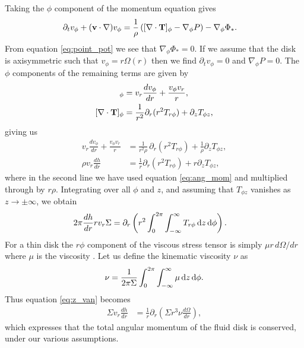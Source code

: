 Taking the $\phi$ component of the momentum equation gives
\begin{align}
    \partial_t v_\phi + (\mathbf{v} \cdot \nabla) v_\phi &= \frac{1}{\rho} \left( [\nabla \cdot \mathbf{T}]_\phi - \nabla_\phi P  \right) - \nabla_\phi \Phi_*.
\end{align}
From equation \ref{eq:point_pot} we see that $\nabla_\phi \Phi_* = 0$. If we assume that the disk is axisymmetric such that $v_\phi=r \Omega(r)$ then we find $\partial_t v_\phi = 0$ and $\nabla_\phi P=0$. 
The $\phi$ components of the remaining terms are given by \citep[eg.][]{armitage2022}
\begin{align}
    [(v \cdot \nabla) \VF{v}]_\phi &= v_r \frac{dv_\phi}{dr} + \frac{v_\phi v_r}{r}, \\
    [\nabla \cdot \VF{T}]_\phi &= \frac{1}{r^2} \partial_r (r^2 T_{r\phi}) + \partial_z T_{\phi z},
\end{align}
giving us
\begin{align}
    v_r \frac{dv_\phi}{dr} + \frac{v_\phi v_r}{r} &= \frac{1}{r^2 \rho} \, \partial_r (r^2 T_{r\phi}) + \frac{1}{\rho} \partial_z T_{\phi z}, \\
    \rho v_r \frac{dh}{dr} &= \frac{1}{r} \partial_r (r^2 T_{r\phi}) + r \partial_z T_{\phi z},
\end{align}
where in the second line we have used equation \ref{eq:ang_mom} and multiplied through by  $r \rho$. Integrating over all $\phi$ and $z$, and assuming that $T_{\phi z}$ vanishes as $z\rightarrow\pm\infty$, we obtain 
\begin{align}
    2\pi \frac{dh}{dr} r v_r \Sigma &= \partial_r \left( r^2 \int_0^{2\pi} \int_{-\infty}^\infty T_{r\phi} \mathop{}\!\mathrm{d}{z} \mathop{}\!\mathrm{d}{\phi} \right). \label{eq:z_van}
\end{align}
For a thin disk the $r\phi$ component of the viscous stress tensor is simply $\mu r \, d\Omega/dr$ where $\mu$ is the viscosity \citep[see review by][]{papaloizou1995}. 
Let us define the kinematic viscosity $\nu$ as 
\begin{align}
    \nu = \frac{1}{2 \pi \Sigma} \int_0^{2\pi} \int_{-\infty}^\infty \mu \mathop{}\!\mathrm{d}{z} \mathop{}\!\mathrm{d}{\phi}.
\end{align}
Thus equation \ref{eq:z_van} becomes
\begin{align}
    \Sigma v_r \frac{dh}{dr} &= \frac{1}{r} \partial_r \left( \Sigma r^3 \nu \frac{d\Omega}{dr} \right), \label{eq:1d_angmom}
\end{align}
which expresses that the total angular momentum of the fluid disk is conserved, under our various assumptions.

